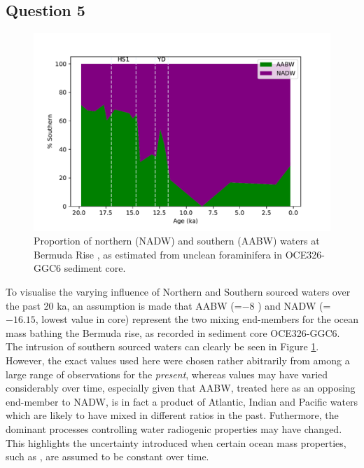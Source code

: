 \subsection{Question 5}
\label{sec:Q2.5}
\begin{figure}[h]
\includegraphics[width=\textwidth]{img/north_south}
    \caption{Proportion of northern (NADW) and southern (AABW) waters at Bermuda Rise , as estimated from unclean foraminifera \eNd{} in OCE326-GGC6 sediment core.}
    \label{fig:north_south}
\end{figure}


To visualise the varying influence of Northern and Southern sourced waters over the past 20 ka, an assumption is made that AABW (\eNd=$-8$ \parencite{garcia2014rare}) and NADW (\eNd=$-16.15$, lowest value in core) represent the two mixing end-members for the ocean mass bathing the Bermuda rise, as recorded in sediment core OCE326-GGC6.
The intrusion of southern sourced waters can clearly be seen in Figure \ref{fig:north_south}.
However, the exact values used here were chosen rather abitrarily from among a large range of observations for the \emph{present}, whereas values may have varied considerably over time, especially given that AABW, treated here as an opposing end-member to NADW, is in fact a product of Atlantic, Indian and Pacific waters which are likely to have mixed in different ratios in the past.
Futhermore, the dominant processes controlling water radiogenic properties may have changed.
This highlights the uncertainty introduced when certain ocean mass properties, such as \eNd{}, are assumed to be constant over time.
